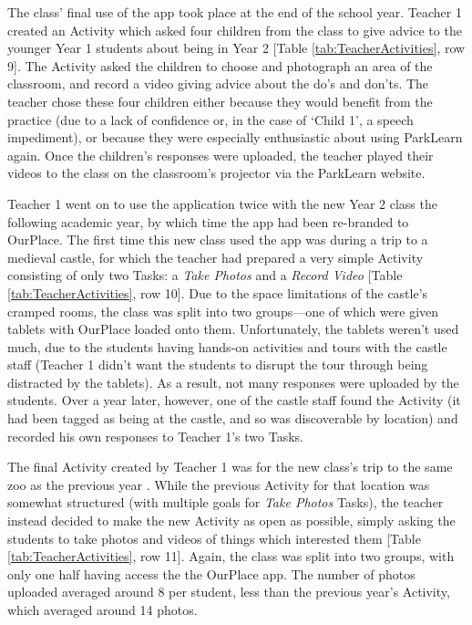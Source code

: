 The class' final use of the app took place at the end of the school year. Teacher 1 created an Activity which asked four children from the class to give advice to the younger Year 1 students about being in Year 2 [Table \ref{tab:TeacherActivities}, row 9]. The Activity asked the children to choose and photograph an area of the classroom, and record a video giving advice about the do’s and don’ts. The teacher chose these four children either because they would benefit from the practice (due to a lack of confidence or, in the case of ‘Child 1’, a speech impediment), or because they were especially enthusiastic about using ParkLearn again. Once the children's responses were uploaded, the teacher played their videos to the class on the classroom's projector via the ParkLearn website.

Teacher 1 went on to use the application twice with the new Year 2 class the following academic year, by which time the app had been re-branded to OurPlace. The first time this new class used the app was during a trip to a medieval castle, for which the teacher had prepared a very simple Activity consisting of only two Tasks: a \textit{Take Photos} and a \textit{Record Video} [Table \ref{tab:TeacherActivities}, row 10]. Due to the space limitations of the castle's cramped rooms, the class was split into two groups---one of which were given tablets with OurPlace loaded onto them. Unfortunately, the tablets weren't used much, due to the students having hands-on activities and tours with the castle staff (Teacher 1 didn't want the students to disrupt the tour through being distracted by the tablets). As a result, not many responses were uploaded by the students. Over a year later, however, one of the castle staff found the Activity (it had been tagged as being at the castle, and so was discoverable by location) and recorded his own responses to Teacher 1's two Tasks.

The final Activity created by Teacher 1 was for the new class's trip to the same zoo as the previous year . While the previous Activity for that location was somewhat structured (with multiple goals for \textit{Take Photos} Tasks), the teacher instead decided to make the new Activity as open as possible, simply asking the students to take photos and videos of things which interested them [Table \ref{tab:TeacherActivities}, row 11]. Again, the class was split into two groups, with only one half having access the the OurPlace app. The number of photos uploaded averaged around 8 per student, less than the previous year's Activity, which averaged around 14 photos.

